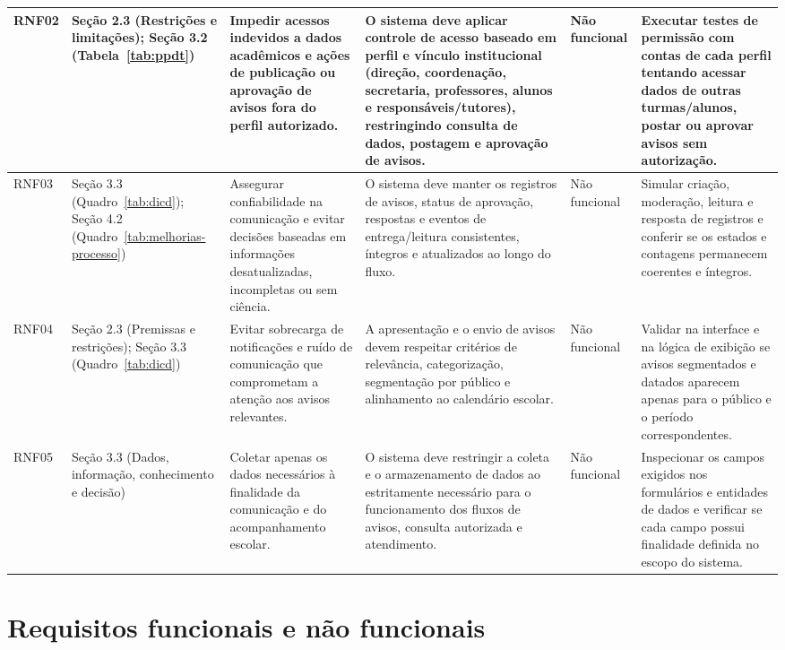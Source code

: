 \documentclass[a4paper,12pt]{report}
\begin{document}
\begin{longtable}{|p{1.1cm}|p{2.5cm}|p{2.8cm}|p{3.4cm}|p{1.6cm}|p{3.0cm}|}
\hline
RNF02 & Seção 2.3 (Restrições e limitações); Seção 3.2 (Tabela~\ref{tab:ppdt}) & Impedir acessos indevidos a dados acadêmicos e ações de publicação ou aprovação de avisos fora do perfil autorizado. & O sistema deve aplicar controle de acesso baseado em perfil e vínculo institucional (direção, coordenação, secretaria, professores, alunos e responsáveis/tutores), restringindo consulta de dados, postagem e aprovação de avisos. & Não funcional & Executar testes de permissão com contas de cada perfil tentando acessar dados de outras turmas/alunos, postar ou aprovar avisos sem autorização. \\
\hline
RNF03 & Seção 3.3 (Quadro~\ref{tab:dicd}); Seção 4.2 (Quadro~\ref{tab:melhorias-processo}) & Assegurar confiabilidade na comunicação e evitar decisões baseadas em informações desatualizadas, incompletas ou sem ciência. & O sistema deve manter os registros de avisos, status de aprovação, respostas e eventos de entrega/leitura consistentes, íntegros e atualizados ao longo do fluxo. & Não funcional & Simular criação, moderação, leitura e resposta de registros e conferir se os estados e contagens permanecem coerentes e íntegros. \\
\hline
RNF04 & Seção 2.3 (Premissas e restrições); Seção 3.3 (Quadro~\ref{tab:dicd}) & Evitar sobrecarga de notificações e ruído de comunicação que comprometam a atenção aos avisos relevantes. & A apresentação e o envio de avisos devem respeitar critérios de relevância, categorização, segmentação por público e alinhamento ao calendário escolar. & Não funcional & Validar na interface e na lógica de exibição se avisos segmentados e datados aparecem apenas para o público e o período correspondentes. \\
\hline
RNF05 & Seção 3.3 (Dados, informação, conhecimento e decisão) & Coletar apenas os dados necessários à finalidade da comunicação e do acompanhamento escolar. & O sistema deve restringir a coleta e o armazenamento de dados ao estritamente necessário para o funcionamento dos fluxos de avisos, consulta autorizada e atendimento. & Não funcional & Inspecionar os campos exigidos nos formulários e entidades de dados e verificar se cada campo possui finalidade definida no escopo do sistema. \\
\hline
\end{longtable}

\section{Requisitos funcionais e não funcionais}
\end{document}
